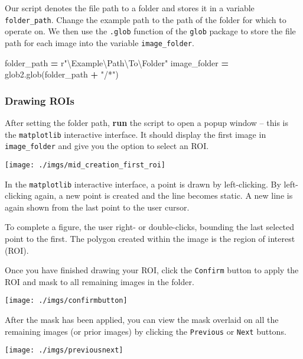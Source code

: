 \documentclass[
]{article}
\newenvironment{Shaded}{\begin{snugshade}}{\end{snugshade}}
\newcommand{\NormalTok}[1]{#1}
\newcommand{\OperatorTok}[1]{\textcolor[rgb]{0.81,0.36,0.00}{\textbf{#1}}}
\newcommand{\StringTok}[1]{\textcolor[rgb]{0.31,0.60,0.02}{#1}}
\newcommand{\VerbatimStringTok}[1]{\textcolor[rgb]{0.31,0.60,0.02}{#1}}
\begin{document}
Our script denotes the file path to a folder and stores it in a variable \texttt{folder\_path}. Change the example path to the path of the folder for which to operate on. We then use the \texttt{.glob} function of the \texttt{glob} package to store the file path for each image into the variable \texttt{image\_folder}.

\begin{Shaded}
\begin{Highlighting}[]
\NormalTok{folder\_path }\OperatorTok{=} \VerbatimStringTok{r"\textbackslash{}Example\textbackslash{}Path\textbackslash{}To\textbackslash{}Folder"}
\NormalTok{image\_folder }\OperatorTok{=}\NormalTok{ glob2.glob(folder\_path }\OperatorTok{+} \StringTok{"/*"}\NormalTok{)}
\end{Highlighting}
\end{Shaded}

\hypertarget{drawing-rois}{%
\subsubsection{Drawing ROIs}\label{drawing-rois}}

After setting the folder path, \textbf{run} the script to open a popup window -- this is the \texttt{matplotlib} interactive interface. It should display the first image in \texttt{image\_folder} and give you the option to select an ROI.

\texttt{[image: ./imgs/mid\_creation\_first\_roi]}

In the \texttt{matplotlib} interactive interface, a point is drawn by left-clicking. By left-clicking again, a new point is created and the line becomes static. A new line is again shown from the last point to the user cursor.

To complete a figure, the user right- or double-clicks, bounding the last selected point to the first. The polygon created within the image is the region of interest (ROI).

Once you have finished drawing your ROI, click the \texttt{Confirm} button to apply the ROI and mask to all remaining images in the folder.

\texttt{[image: ./imgs/confirmbutton]}

After the mask has been applied, you can view the mask overlaid on all the remaining images (or prior images) by clicking the \texttt{Previous} or \texttt{Next} buttons.

\texttt{[image: ./imgs/previousnext]}
\end{document}
